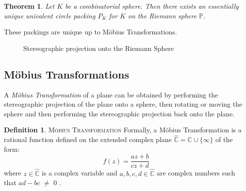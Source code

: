 \documentclass[11pt]{article}
\newcommand{\C}{\mathbb{C}}
\newcommand{\CP}{\hat{\mathbb{C}}}
\newtheorem{theorem}{Theorem}[section]
\theoremstyle{definition}
\newtheorem{definition}{Definition}[section]
\begin{document}
	\begin{theorem}
		Let $K$ be a combinatorial sphere. 
		Then there exists an essentially unique univalent circle packing $P_K$ for $K$ on the Riemann sphere $\mathbb{P}$.
	\end{theorem}
	
	These packings are unique up to M\"{o}bius Transformations.

	\begin{figure}[h]%
    		\centering
    		\qquad
    		\caption{Stereographic projection onto the Riemann Sphere}%
    		\label{fig:riemann}%
	\end{figure}

\subsection{M\"{o}bius Transformations}
	
	A \emph{M\"{o}bius Transformation} of a plane can be obtained by performing the stereographic projection of the plane onto a sphere, then rotating or moving the sphere and then performing the stereographic projection back onto the plane. 
	
 	\theoremstyle{definition}
	\begin{definition}{\textsc{M\"{o}bius Transformation}}
		Formally, a M\"{o}bius Transformation is a rational function defined on the extended complex plane $\CP = \C\cup\{\infty\}$ of the form:
  		\begin{equation} 
  			f(z) = \frac{az+b}{cz+d}
  		\end{equation}
  	where $z\in\CP$ is a complex variable and $a,b,c,d\in\CP$ are complex numbers such that $ad - bc$ $\neq$ $0$ \cite{stephenson05introduction}. 
	\end{definition}
	
\end{document}
